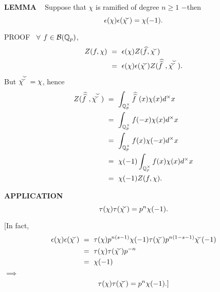 \vspace{0.2cm}

\begin{x}{\small\bf LEMMA} \ %
Suppose that $\chi$ is ramified of degree $n \ge 1$ $-$then
\[
 \epsilon(\chi)  \epsilon(\widecheck{\chi}) = \chi(-1).
\]

\vspace{0.1cm}

PROOF \  
$\forall$ $f \in \mathcal{B}(\mathbb{Q}_p)$, 
\begin{align*}
Z(f, \chi) 	\ 
&=\   \epsilon(\chi) Z(\widehat{f}, \widecheck{\chi}) \\		
&=\   \epsilon(\chi)  \epsilon(\widecheck{\chi}) Z(\widehat{\widehat{f}\hspace{.125cm}}, \widecheck{\widecheck{\chi}}).
\end{align*}
But $\widecheck{\widecheck{\chi}} = \chi$, hence
\begin{align*}
Z(\widehat{\widehat{f}\hspace{.125cm}}, \widecheck{\widecheck{\chi}}) \ 	
&=\   \int_{\Q_p^\times} \widehat{\widehat{f}\hspace{.125cm}}(x) \chi(x) d^\times x \\		
&=\   \int_{\Q_p^\times} f(-x)\chi(x) d^\times x \\	
&=\   \int_{\Q_p^\times} f(x)\chi(-x) d^\times x \\
&=\   \chi(-1) \int_{\Q_p^\times} f(x)\chi(x) d^\times x \\
&=\   \chi(-1) Z(f, \chi).
\end{align*}
\end{x}

\vspace{0.1cm}

\begin{x}{\small\bf APPLICATION} \ %
\[
\tau(\chi) \tau(\widecheck{\chi}) = p^n \chi(-1).
\]

[In fact,
\begin{align*}
\epsilon(\chi)  \epsilon(\widecheck{\chi}) \ 
&= \  \tau(\chi)p^{n(s-1)} \chi(-1) \tau(\widecheck{\chi}) p^{n(1 - s - 1)} \widecheck{\chi}(-1) \\
&= \  \tau(\chi) \tau(\widecheck{\chi}) p^{-n} \\
&= \  \chi(-1)
\end{align*}
\qquad\qquad $\implies$
\[
\tau(\chi) \tau(\widecheck{\chi}) = p^n \chi(-1).]
\]
\end{x}

